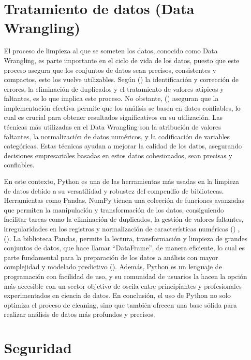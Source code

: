 \documentclass[letter,oneside,12pt,spanish]{report}
\begin{document}
\section{Tratamiento de datos (Data Wrangling)}

\noindent El proceso de limpieza al que se someten los datos, conocido como Data Wrangling, es parte importante en el ciclo de vida de los datos, puesto que este proceso asegura que los conjuntos de datos sean precisos, consistentes y compactos, esto los vuelve utilizables. Según (\cite{rattenbury2017principles}) la identificación y corrección de errores, la eliminación de duplicados y el tratamiento de valores atípicos y faltantes, es lo que implica este proceso. No obstante, (\cite{kazil2016data}) aseguran que la implementación efectiva permite que los análisis se basen en datos confiables, lo cual es crucial para obtener resultados significativos en su utilización. Las técnicas más utilizadas en el Data Wrangling son la atribución de valores faltantes, la normalización de datos numéricos, y la codificación de variables categóricas. Estas técnicas ayudan a mejorar la calidad de los datos, asegurando decisiones empresariales basadas en estos datos cohesionados, sean precisas y confiables.

\noindent En este contexto, Python es una de las herramientas más usadas en la limpieza de datos debido a su versatilidad y robustez del compendio de bibliotecas. Herramientas como Pandas, NumPy tienen una colección de funciones avanzadas que permiten la manipulación y transformación de los datos, consiguiendo facilitar tareas como la eliminación de duplicados, la gestión de valores faltantes, irregularidades en los registros y normalización de características numéricas (\cite{vanderAalst2018rpa}) , (\cite{jafari2024datapreprocessing}). La biblioteca Pandas, permite la lectura, transformación y limpieza de grandes conjuntos de datos, que hace llamar “DataFrame”, de manera eficiente, lo cual es parte fundamental para la preparación de los datos a análisis con mayor complejidad y modelado predictivo (\cite{provost2013datascience}). Además, Python es un lenguaje de programación con facilidad de uso, y su comunidad de usuarios la hacen la opción más accesible con un sector objetivo de oscila entre principiantes y profesionales experimentados en ciencia de datos. En conclusión, el uso de Python no solo optimiza el proceso de cleaning, sino que también ofrecen una base sólida para realizar análisis de datos más profundos y precisos. 


\section{Seguridad}
\end{document}
